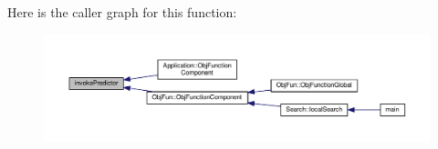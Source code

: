 Here is the caller graph for this function\-:\nopagebreak
\begin{figure}[H]
\begin{center}
\leavevmode
\includegraphics[width=350pt]{invokePredictor_8hh_a342ccdfe7923368e52a4894d69c7455a_icgraph}
\end{center}
\end{figure}


